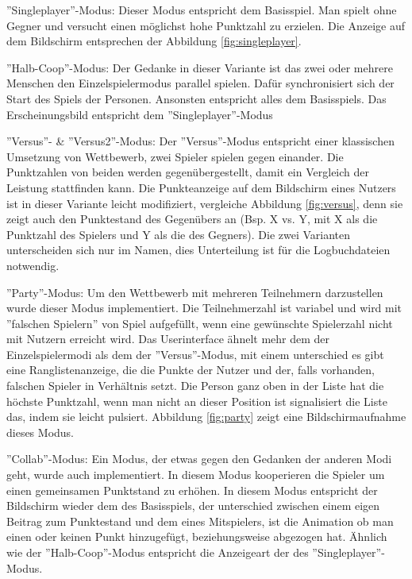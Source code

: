 \item''Singleplayer''-Modus:\newline
Dieser Modus entspricht dem Basisspiel. Man spielt ohne Gegner und versucht einen möglichst hohe Punktzahl zu erzielen. Die Anzeige auf dem Bildschirm entsprechen der Abbildung \ref{fig:singleplayer}.
\item''Halb-Coop''-Modus:\newline{}
Der Gedanke in dieser Variante ist das zwei oder mehrere Menschen den Einzelspielermodus parallel spielen. Dafür synchronisiert sich der Start des Spiels der Personen. Ansonsten entspricht alles dem Basisspiels. Das Erscheinungsbild entspricht dem ''Singleplayer''-Modus
\item''Versus''- \& ''Versus2''-Modus:\newline
Der ''Versus''-Modus entspricht einer klassischen Umsetzung von Wettbewerb, zwei Spieler spielen gegen einander. Die Punktzahlen von beiden werden gegenübergestellt, damit ein Vergleich der Leistung stattfinden kann. Die Punkteanzeige auf dem Bildschirm eines Nutzers ist in dieser Variante leicht modifiziert,  vergleiche Abbildung \ref{fig:versus}, denn sie zeigt  auch den Punktestand des Gegenübers an (Bsp. X vs. Y, mit X als die Punktzahl des Spielers und Y als die des Gegners). Die zwei Varianten unterscheiden sich nur im Namen, dies Unterteilung ist für die Logbuchdateien notwendig.
\item''Party''-Modus:\newline
Um den Wettbewerb mit mehreren Teilnehmern darzustellen wurde dieser Modus implementiert. Die Teilnehmerzahl ist variabel und wird mit ''falschen Spielern'' von Spiel aufgefüllt, wenn eine gewünschte Spielerzahl nicht mit Nutzern erreicht wird. Das Userinterface ähnelt mehr dem der Einzelspielermodi als dem der ''Versus''-Modus, mit einem unterschied es gibt eine Ranglistenanzeige, die die Punkte der Nutzer und der, falls vorhanden, falschen Spieler in Verhältnis setzt. Die Person ganz oben in der Liste hat die höchste Punktzahl, wenn man nicht an dieser Position ist signalisiert die Liste das, indem sie leicht pulsiert. Abbildung \ref{fig:party} zeigt eine Bildschirmaufnahme dieses Modus.
\item''Collab''-Modus:\newline
Ein Modus, der etwas gegen den Gedanken der anderen Modi geht, wurde auch implementiert.  In diesem Modus kooperieren die Spieler um einen gemeinsamen Punktstand zu erhöhen. In diesem Modus entspricht der Bildschirm wieder dem des Basisspiels, der unterschied zwischen einem eigen Beitrag zum Punktestand und dem eines Mitspielers, ist die Animation ob man einen oder keinen Punkt hinzugefügt, beziehungsweise abgezogen hat. Ähnlich wie der ''Halb-Coop''-Modus entspricht die Anzeigeart der des ''Singleplayer''-Modus.

